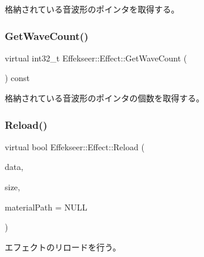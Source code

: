 格納されている音波形のポインタを取得する。 

\mbox{\label{class_effekseer_1_1_effect_af0a2c4cb045d9989619beedd078ff735}} 
\subsubsection{\texorpdfstring{Get\+Wave\+Count()}{GetWaveCount()}}
{\footnotesize\ttfamily virtual int32\+\_\+t Effekseer\+::\+Effect\+::\+Get\+Wave\+Count (\begin{DoxyParamCaption}{ }\end{DoxyParamCaption}) const\hspace{0.3cm}{\ttfamily [pure virtual]}}



格納されている音波形のポインタの個数を取得する。 

\mbox{\label{class_effekseer_1_1_effect_a32c3c8d5a582f7ebaad34b1fb32e6d70}} 
\subsubsection{\texorpdfstring{Reload()}{Reload()}\hspace{0.1cm}{\footnotesize\ttfamily [1/4]}}
{\footnotesize\ttfamily virtual bool Effekseer\+::\+Effect\+::\+Reload (\begin{DoxyParamCaption}\item[{\mbox{\hyperlink{namespace_effekseer_ab34c4088e512200cf4c2716f168deb56}{void}} $\ast$}]{data,  }\item[{int32\+\_\+t}]{size,  }\item[{const \mbox{\hyperlink{_effekseer_8h_aca7eb5de6dd019c19ac58ea35a193f2f}{E\+F\+K\+\_\+\+C\+H\+AR}} $\ast$}]{material\+Path = {\ttfamily NULL} }\end{DoxyParamCaption})\hspace{0.3cm}{\ttfamily [pure virtual]}}



エフェクトのリロードを行う。 

\mbox{\label{class_effekseer_1_1_effect_acd86f6147154097e727246f7671d99ef}} 

